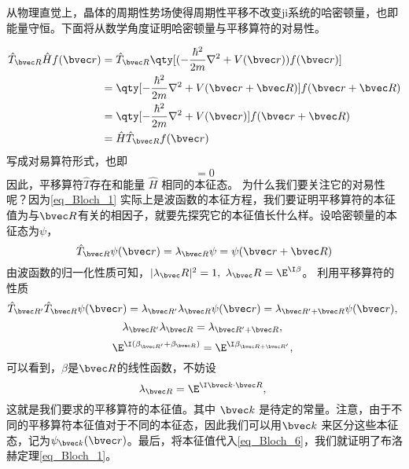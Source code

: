 从物理直觉上，晶体的周期性势场使得周期性平移不改变ji系统的哈密顿量，也即能量守恒。下面将从数学角度证明哈密顿量与平移算符的对易性。

\begin{align}
\hat{T}_{\bvec R} \hat{H} f(\bvec r) &= \hat{T}_{\bvec R} \qty[(-\frac{\hbar^2}{2m}\nabla^2+V(\bvec r) ) f(\bvec r)] \\
&= \qty[-\frac{\hbar^2}{2m}\nabla^2+V(\bvec r + \bvec R)]  f(\bvec r + \bvec R)\\
&= \qty[-\frac{\hbar^2}{2m}\nabla^2+V(\bvec r) ] f(\bvec r+ \bvec R)\\
& = \hat{H} \hat{T}_{\bvec R} f(\bvec r)
\end{align}
写成对易算符形式，也即
\begin{equation}
[\hat{T},\hat{H}] = 0
\end{equation}
因此，平移算符$\hat{T}$存在和能量 $\hat{H}$ 相同的本征态。
为什么我们要关注它的对易性呢？因为\autoref{eq_Bloch_1} 实际上是波函数的本征方程，我们要证明平移算符的本征值为与$\bvec R$有关的相因子，就要先探究它的本征值长什么样。设哈密顿量的本征态为$\psi$，
\begin{equation}\label{eq_Bloch_6}
\hat{T}_{\bvec R} \psi (\bvec r) = \lambda_{\bvec R}\psi =\psi(\bvec r + \bvec R) 
\end{equation}
由波函数的归一化性质可知，$|\lambda_\bvec R |^2 = 1,~ \lambda_\bvec R = \E^{\I \beta}$。 利用平移算符的性质
\begin{equation}
\hat{T}_{\bvec R'} \hat{T}_{\bvec R}\psi (\bvec r) = \lambda_{\bvec R'}\lambda_{\bvec R}\psi (\bvec r) = \lambda_{\bvec R' + \bvec R} \psi (\bvec r),~
\end{equation}
\begin{equation}
\lambda_{\bvec R'}\lambda_{\bvec R} =  \lambda_{\bvec R' + \bvec R},~
\end{equation}
\begin{equation}
\E^{\I (\beta_{\bvec R'}+ \beta_{\bvec R})} = \E^{\I \beta_{\bvec R + \bvec R'}},~
\end{equation}
可以看到，$\beta$是$\bvec R$的线性函数，不妨设
\begin{equation}
\lambda_{\bvec R} = \E^{\I \bvec k \cdot \bvec R},~
\end{equation}
这就是我们要求的平移算符的本征值。其中 $\bvec k$ 是待定的常量。注意，由于不同的平移算符本征值对于不同的本征态，因此我们可以用$\bvec k$ 来区分这些本征态，记为$\psi_{\bvec k} (\bvec r)$。最后，将本征值代入\autoref{eq_Bloch_6}，我们就证明了布洛赫定理\autoref{eq_Bloch_1}。

